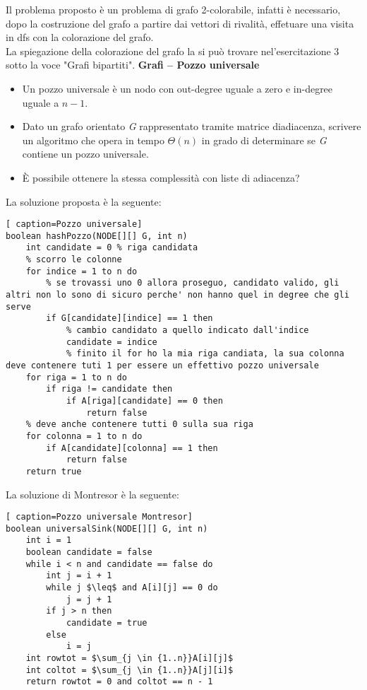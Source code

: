 \documentclass[../cheatSheetAlgoritmi.tex]{subfiles}
\begin{document}
Il problema proposto è un problema di grafo 2-colorabile, infatti è necessario, dopo la costruzione del grafo a partire dai vettori di rivalità, effetuare una visita in dfs con la colorazione del grafo. \\
La spiegazione della colorazione del grafo la si può trovare nel'esercitazione 3 sotto la voce "Grafi bipartiti".
\newpage
\textbf{Grafi – Pozzo universale}\\
\begin{itemize}
	\item Un pozzo universale è un nodo con out-degree uguale a zero e in-degree uguale a $n-1$.
	\item Dato un grafo orientato \textit{G} rappresentato tramite matrice diadiacenza, scrivere un algoritmo che opera in tempo $\Theta(n)$ in grado di determinare se \textit{G} contiene un pozzo universale.
	\item È possibile ottenere la stessa complessità con liste di adiacenza?
\end{itemize}
La soluzione proposta è la seguente:\\
\begin{lstlisting}[ caption=Pozzo universale]
boolean hashPozzo(NODE[][] G, int n)
	int candidate = 0 % riga candidata
  	% scorro le colonne
  	for indice = 1 to n do
  		% se trovassi uno 0 allora proseguo, candidato valido, gli altri non lo sono di sicuro perche' non hanno quel in degree che gli serve
    	if G[candidate][indice] == 1 then
      		% cambio candidato a quello indicato dall'indice
      		candidate = indice
  			% finito il for ho la mia riga candiata, la sua colonna deve contenere tuti 1 per essere un effettivo pozzo universale
  	for riga = 1 to n do
    	if riga != candidate then
      		if A[riga][candidate] == 0 then
        		return false
  	% deve anche contenere tutti 0 sulla sua riga
  	for colonna = 1 to n do
  		if A[candidate][colonna] == 1 then
    		return false
  	return true
\end{lstlisting}
La soluzione di Montresor è la seguente:
\begin{lstlisting}[ caption=Pozzo universale Montresor]
boolean universalSink(NODE[][] G, int n)
	int i = 1
  	boolean candidate = false
  	while i < n and candidate == false do
    	int j = i + 1
    	while j $\leq$ and A[i][j] == 0 do
      		j = j + 1
    	if j > n then
      		candidate = true
    	else
      		i = j
  	int rowtot = $\sum_{j \in {1..n}}A[i][j]$
  	int coltot = $\sum_{j \in {1..n}}A[j][i]$
  	return rowtot = 0 and coltot == n - 1
\end{lstlisting}
\end{document}
